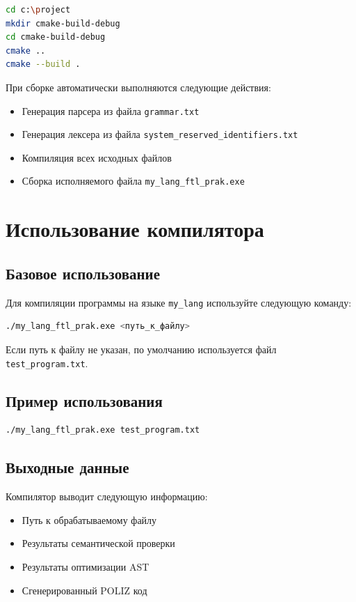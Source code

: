 \documentclass[12pt,a4paper]{article}
\begin{document}
\begin{lstlisting}[language=bash]
cd c:\project
mkdir cmake-build-debug
cd cmake-build-debug
cmake ..
cmake --build .
\end{lstlisting}

При сборке автоматически выполняются следующие действия:
\begin{itemize}
    \item Генерация парсера из файла \texttt{grammar.txt}
    \item Генерация лексера из файла \texttt{system\_reserved\_identifiers.txt}
    \item Компиляция всех исходных файлов
    \item Сборка исполняемого файла \texttt{my\_lang\_ftl\_prak.exe}
\end{itemize}

\section{Использование компилятора}

\subsection{Базовое использование}

Для компиляции программы на языке \texttt{my\_lang} используйте следующую команду:

\begin{lstlisting}[language=bash]
./my_lang_ftl_prak.exe <путь_к_файлу>
\end{lstlisting}

Если путь к файлу не указан, по умолчанию используется файл \texttt{test\_program.txt}.

\subsection{Пример использования}

\begin{lstlisting}[language=bash]
./my_lang_ftl_prak.exe test_program.txt
\end{lstlisting}

\subsection{Выходные данные}

Компилятор выводит следующую информацию:
\begin{itemize}
    \item Путь к обрабатываемому файлу
    \item Результаты семантической проверки
    \item Результаты оптимизации AST
    \item Сгенерированный POLIZ код
\end{itemize}
\end{document}
